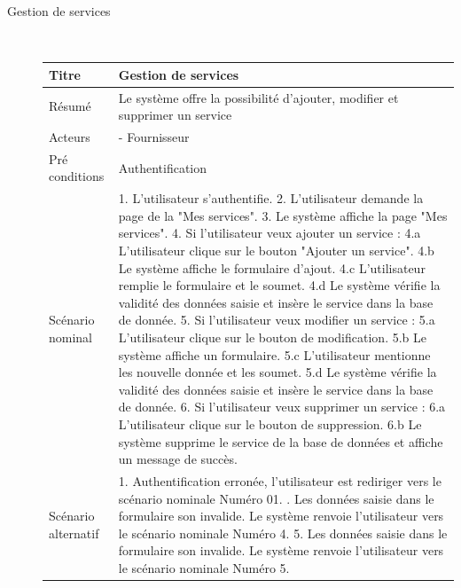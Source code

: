 \documentclass[french]{report}
\begin{document}
\begin{description}
    \newpage
        \item[Gestion de services] \hfill \\
        \begin{minipage}{\linewidth}
        \centering
            \def\arraystretch{2}
            \begin{tabular}{|m{3cm}|m{9cm}|}
            \hline
            Titre                & Gestion de services \\ 
            \hline
            Résumé               & Le système offre la possibilité d'ajouter, modifier et supprimer un service \\ 
            \hline
            Acteurs              & - Fournisseur  \\ 
            \hline
            Pré conditions       & Authentification  \\ 
            \hline
            Scénario nominal     &  
                1. L'utilisateur s'authentifie. 
                2. L'utilisateur demande la page de la "Mes services".
                3. Le système affiche la page "Mes services". 
                4. Si l'utilisateur veux ajouter un service :
                    4.a L'utilisateur clique sur le bouton "Ajouter un service". 
                    4.b Le système affiche le formulaire d'ajout. 
                    4.c L'utilisateur remplie le formulaire et le soumet. 
                    4.d Le système vérifie la validité des données saisie et insère le service dans la base de donnée.
                5. Si l'utilisateur veux modifier un service : 
                    5.a L'utilisateur clique sur le bouton de modification. 
                    5.b Le système affiche un formulaire. 
                    5.c L'utilisateur mentionne les nouvelle donnée et les soumet.
                    5.d Le système vérifie la validité des données saisie et insère le service dans la base de donnée.
                6. Si l'utilisateur veux supprimer un service : 
                    6.a L'utilisateur clique sur le bouton de suppression.
                    6.b Le système supprime le service de la base de données et affiche un message de succès.
                \\ 
            \hline
            Scénario alternatif &   
                1. Authentification erronée, l'utilisateur est rediriger vers le scénario nominale Numéro 01. \newline
                4.  Les données saisie dans le formulaire son invalide. Le système renvoie l'utilisateur vers le scénario nominale Numéro 4.
                5.  Les données saisie dans le formulaire son invalide. Le système renvoie l'utilisateur vers le scénario nominale Numéro 5.
                

\end{tabular}
\end{minipage}
\end{description}
\end{document}

